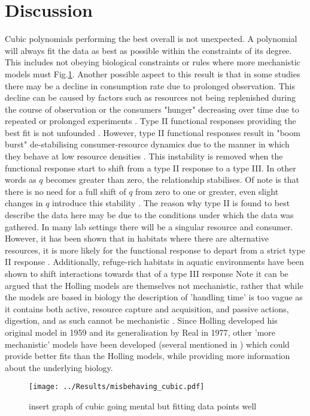 \documentclass[a4paper]{article}
\numberwithin{equation}{section}
\begin{document}
\section{Discussion}
Cubic polynomials performing the best overall is not unexpected.  A polynomial will always fit the data as best as possible within the constraints of its degree.  This includes not obeying biological constraints or rules where more mechanistic models must Fig.\ref{cubic}. Another possible aspect to this result is that in some studies there may be a decline in consumption rate due to prolonged observation.  This decline can be caused by factors such as resources not being replenished during the course of observation \citep{Rosenbaum2018} or the consumers "hunger" decreasing over time due to repeated or prolonged experiments \citep{Holling1966}.
\newline
Type II functional responses providing the best fit is not unfounded \citep{Dunn2020}.  However, type II functional responses result in "boom burst"  de-stabilising consumer-resource dynamics due to the manner in which they behave at low resource densities \citep{Dunn2020, Rosenbaum2018, Real1979, Holling1959a, Vucic-Pestic2010}.
This instability is removed when the functional response start to shift from a type II response to a type III.  In other words as $q$ becomes greater than zero, the relationship stabilises.  Of note is that there is no need for a full shift of $q$ from zero to one or greater, even slight changes in $q$ introduce this stability \citep{Dunn2020, Rosenbaum2018, Real1979}. The reason why type II is found to best describe the data here may be due to the conditions under which the data was gathered.  In many lab settings there will be a singular resource and consumer.  However, it has been shown that in habitats where there are alternative resources, it is more likely for the functional response to depart from a strict type II response \citep{Holling1959a}.
Additionally, refuge-rich habitats in aquatic environments have been shown to shift interactions towards that of a type III response \citep{Dunn2020}
\newline
Note it can be argued that the Holling models are themselves not mechanistic, rather that  while the models are based in biology the description of 'handling time' is too vague as it contains both active, resource capture and acquisition, and passive actions, digestion, and as such cannot be mechanistic \citep{Jeschke2002a}.  Since Holling developed his original model in 1959 \citep{Holling1959} and its generalisation by Real in 1977\citep{Real1977}, other 'more mechanistic' models have been developed  \citep{Jeschke2002a} (several mentioned in \citep{Rosenbaum2018}) which could provide better fits than the Holling models, while providing more information about the underlying biology.  
\begin{figure}[H]
	\begin{center}
		\texttt{[image: ../Results/misbehaving\_cubic.pdf]}
	\end{center}
	\caption{insert graph of cubic going mental but fitting data points well}
	\label{cubic}
\end{figure}
\end{document}
